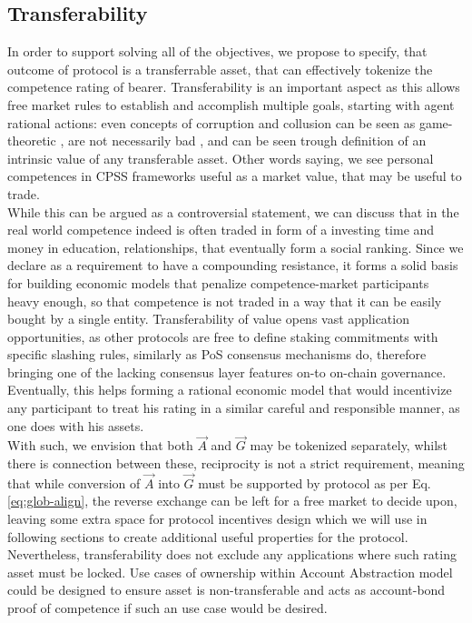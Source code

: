 \documentclass{article}
\begin{document}
\begin{CJK}{UTF8}{gbsn}
\begin{multicols}{2}
        \subsection{Transferability}
        \label{sec:transferability}
        In order to support solving all of the objectives, we propose to specify, that outcome of protocol is a transferrable asset, that can effectively tokenize the competence rating of bearer.
        Transferability is an important aspect as this allows free market rules to establish and accomplish multiple goals, starting with agent rational actions: even concepts of corruption and collusion can be seen as game-theoretic \cite{Macrae1982}, are not necessarily bad \cite{Leff1964}, and can be seen trough definition of an intrinsic value of any transferable asset. Other words saying, we see personal competences in CPSS frameworks useful as a market value, that may be useful to trade. \\While this can be argued as a controversial statement, we can discuss that in the real world competence indeed is often traded in form of a investing time and money in education, relationships, that eventually form a social ranking. Since we declare as a requirement to have a compounding resistance, it forms a solid basis for building economic models that penalize competence-market participants heavy enough,  so that competence is not traded in a way that it can be easily bought by a single entity.
        Transferability of value opens vast application opportunities, as other protocols are free to define staking commitments with specific slashing rules, similarly as PoS consensus mechanisms do, therefore bringing one of the lacking consensus layer features on-to on-chain governance. Eventually, this helps forming a rational economic model that would incentivize any participant to treat his rating in a similar careful and responsible manner, as one does with his assets.\\
        With such, we envision that both ${\vec{A}}$ and ${\vec{G}}$ may be tokenized separately, whilst there is connection between these, reciprocity is not a strict requirement, meaning that while conversion of ${\vec{A}}$ into ${\vec{G}}$ must be supported by protocol as per Eq. \ref{eq:glob-align}, the reverse exchange can be left for a free market to decide upon, leaving some extra space for protocol incentives design which we will use in following sections to create additional useful properties for the protocol.
        Nevertheless, transferability does not exclude any applications where such rating asset must be locked. Use cases of ownership within Account Abstraction\cite{Qin2023} model could be designed to ensure asset is non-transferable and acts as account-bond proof of competence if such an use case would be desired.\\


\end{multicols}
\end{CJK}
\end{document}
